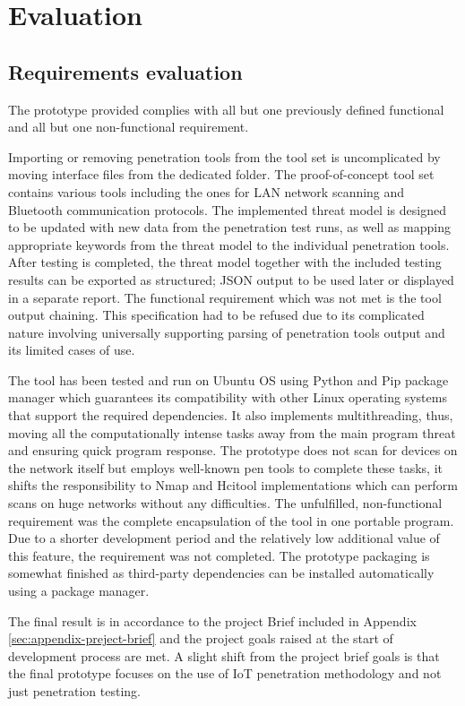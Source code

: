 \section{Evaluation}
	
	\subsection{Requirements evaluation}
	The prototype provided complies with all but one previously defined functional and all but one non-functional requirement. 
	
	Importing or removing penetration tools from the tool set is uncomplicated by moving interface files from the dedicated folder. The proof-of-concept tool set contains various tools including the ones for LAN network scanning and Bluetooth communication protocols. The implemented threat model is designed to be updated with new data from the penetration test runs, as well as mapping appropriate keywords from the threat model to the individual penetration tools. After testing is completed, the threat model together with the included testing results can be exported as structured; JSON output to be used later or displayed in a separate report. 
	The functional requirement which was not met is the tool output chaining. This specification had to be refused due to its complicated nature involving universally supporting parsing of penetration tools output and its limited cases of use.
	
	The tool has been tested and run on Ubuntu OS using Python and Pip package manager which guarantees its compatibility with other Linux operating systems that support the required dependencies. It also implements multithreading, thus, moving all the computationally intense tasks away from the main program threat and ensuring quick program response. The prototype does not scan for devices on the network itself but employs well-known pen tools to complete these tasks, it shifts the responsibility to Nmap and Hcitool implementations which can perform scans on huge networks without any difficulties. 
	The unfulfilled, non-functional requirement was the complete encapsulation of the tool in one portable program. Due to a shorter development period and the relatively low additional value of this feature, the requirement was not completed. The prototype packaging is somewhat finished as third-party dependencies can be installed automatically using a package manager.
	
	The final result is in accordance to the project Brief included in Appendix \ref{sec:appendix-preject-brief} and the project goals raised at the start of development process are met. A slight shift from the project brief goals is that the final prototype focuses on the use of IoT penetration methodology and not just penetration testing.
	
